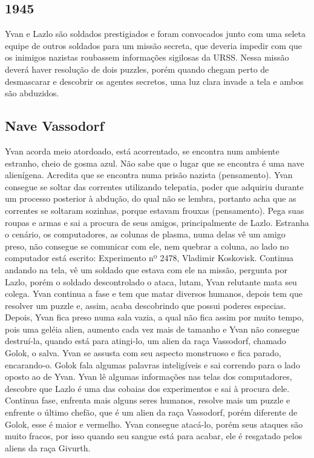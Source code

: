 \documentclass[12pt, a4paper]{article}
\begin{document}
	\subsection{1945}

	Yvan e Lazlo são soldados prestigiados e foram convocados junto
    com uma seleta equipe de outros soldados para um missão secreta,
    que deveria impedir com que os inimigos nazistas roubassem
    informações sigilosas da URSS. Nessa missão deverá haver resolução 
    de dois puzzles, porém quando chegam perto de desmascarar e 
    descobrir os agentes secretos, uma luz clara invade a tela e 
    ambos são abduzidos.

	\subsection{Nave Vassodorf}

	Yvan acorda meio atordoado, está acorrentado, se encontra num 
    ambiente estranho, cheio de gosma azul. Não sabe que o lugar 
    que se encontra é uma nave alienígena. Acredita que se encontra
    numa prisão nazista (pensamento). Yvan consegue se soltar das 
    correntes utilizando telepatia, poder que adquiriu durante um 
    processo posterior à abdução, do qual não se lembra, portanto 
    acha que as correntes se soltaram sozinhas, porque estavam frouxas
    (pensamento). Pega suas roupas e armas e sai a procura de seus 
    amigos, principalmente de Lazlo.  Estranha o cenário, os 
    computadores, as colunas de plasma, numa delas vê um amigo preso,
    não consegue se comunicar com ele, nem quebrar a coluna, ao lado 
    no computador está escrito: Experimento nº 2478, Vladimir Koskovisk.
    Continua andando na tela, vê um soldado que estava com ele na missão,
    pergunta por Lazlo, porém o soldado descontrolado o ataca, lutam,
    Yvan relutante mata seu colega. Yvan continua a fase e tem que matar 
    diversos humanos, depois tem que resolver um puzzle e, assim, acaba 
    descobrindo que possui poderes especias. Depois, Yvan fica preso numa 
    sala vazia, a qual não fica assim por muito tempo, pois uma geléia 
    alien, aumento cada vez mais de tamanho e Yvan não consegue destruí-la,
    quando está para atingi-lo, um alien da raça Vassodorf, chamado
    Golok, o salva. Yvan se assusta com seu aspecto monstruoso e fica 
    parado, encarando-o. Golok fala algumas palavras inteligíveis e 
    sai correndo para o lado oposto ao de Yvan.  Yvan lê algumas 
    informações nas telas dos computadores, descobre que Lazlo é uma
    das cobaias dos experimentos e sai à procura dele. Continua fase,
    enfrenta mais alguns seres humanos, resolve mais um puzzle e 
    enfrente o último chefão, que é um alien da raça Vassodorf, porém 
    diferente de Golok, esse é maior e vermelho. Yvan consegue atacá-lo,
    porém seus ataques são muito fracos, por isso quando seu sangue está
    para acabar, ele é resgatado pelos aliens da raça Givurth.
\end{document}
